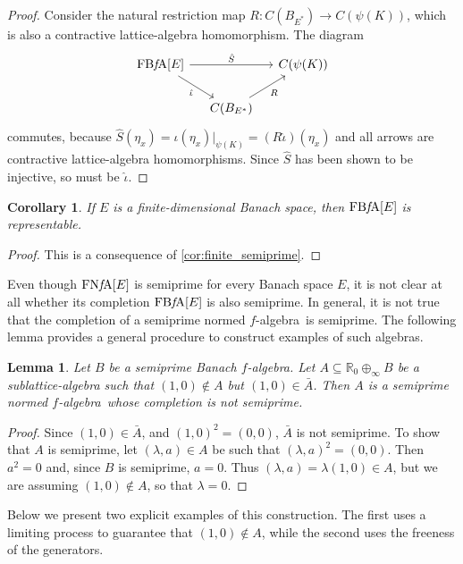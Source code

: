 \documentclass{memo-l}
\newtheorem{lem}[theorem]{Lemma}
\newtheorem{cor}[theorem]{Corollary}
\theoremstyle{definition}
\theoremstyle{remark}
\numberwithin{section}{chapter}
\numberwithin{equation}{chapter}
\newcommand\R{\ensuremath{\mathbb{R}}}
\newcommand{\falg}{$f\!$-algebra}
\newcommand{\FNFA}[1]{\operatorname{FN{\it f}\!A}[#1]}
\newcommand{\FBFA}[1]{\operatorname{FB{\it f}\!A}[#1]}
\begin{document}
\begin{proof}
    Consider the natural restriction map $R\colon C(B_{E^{*}})\to
    C(\psi (K))$, which is also a contractive lattice-algebra homomorphism. The diagram
    \[
    \begin{tikzcd}[column sep=small]
        \FBFA E \arrow[rr, "\hat{S}"]\arrow[dr, "\hat{\iota }"']&
                                                            &C(\psi
                                                            (K))\\
        &C(B_{E^{*}})\arrow[ru, "R"']&
    \end{tikzcd}
    \]
    commutes, because $\hat{S} (\eta _x)=\iota (\eta _x)|_{\psi (K)}=(R
    \hat{\iota })(\eta
    _x)$ and all arrows are contractive lattice-algebra homomorphisms. Since
    $\hat{S}$ has been shown to be injective, so must be $\hat{\iota }$.
\end{proof}

\begin{cor}\label{cor:finite_representable}
    If $E$ is a finite-dimensional Banach space, then $\FBFA E$ is
    representable.
\end{cor}
\begin{proof}
    This is a consequence of \cref{cor:finite_semiprime}.
\end{proof}

Even though $\FNFA E$ is semiprime for every Banach space $E$, it
is not clear at all whether its completion $\FBFA E$ is also
semiprime. In general, it is not true that the completion of a
semiprime normed \falg\ is semiprime. The following lemma provides a
general procedure to construct examples of such algebras.

\begin{lem}\label{lem:comp_falg}
    Let $B$ be a semiprime Banach \falg. Let $A\subseteq \R_0\oplus_\infty B$
    be a sublattice-algebra such that $(1,0)\not\in A$ but $(1,0)\in
    \bar{A}$. Then $A$ is a semiprime normed \falg\ whose completion
    is not semiprime.
\end{lem}
\begin{proof}
    Since $(1,0) \in \bar{A}$, and $(1,0)^2=(0,0)$, $\bar{A}$ is not
    semiprime. To show that $A$ is semiprime, let $(\lambda,a)\in A$
    be such that $(\lambda,a )^2=(0,0)$. Then $a^2=0$ and, since $B$
    is semiprime, $a=0$. Thus $(\lambda ,a)=\lambda (1,0) \in A$, but
    we are assuming $(1,0) \not\in A$, so that $\lambda =0$.
\end{proof}

Below we present two explicit examples of this construction. The first
uses a limiting process to guarantee that $(1,0)\not\in A$, while the
second uses the freeness of the generators.
\end{document}
